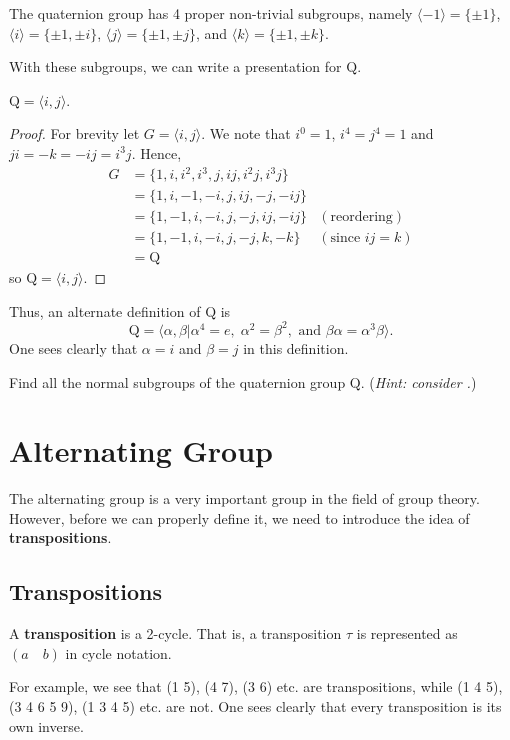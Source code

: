 The quaternion group has 4 proper non-trivial subgroups, namely $\langle -1 \rangle = \{\pm1\}$, $\langle i \rangle = \{\pm1, \pm i\}$, $\langle j \rangle = \{\pm1, \pm j\}$, and $\langle k \rangle = \{\pm1, \pm k\}$.

With these subgroups, we can write a presentation for $\mathrm{Q}$.
\begin{proposition}
    $\mathrm{Q} = \langle i, j \rangle$.
\end{proposition}
\begin{proof}
    For brevity let $G = \langle i, j \rangle$. We note that $i^0 = 1$, $i^4 = j^4 = 1$ and $ji = -k = -ij = i^3j$. Hence,
    \begin{align*}
        G &= \{1, i, i^2, i^3, j, ij, i^2j, i^3j\}\\
        &= \{1, i, -1, -i, j, ij, -j, -ij\}\\
        &= \{1, -1, i, -i, j, -j, ij, -ij\} & (\text{reordering})\\
        &= \{1, -1, i, -i, j, -j, k, -k\} & (\text{since } ij = k)\\
        &= \mathrm{Q}
    \end{align*}
    so $\mathrm{Q} = \langle i, j \rangle$.
\end{proof}

Thus, an alternate definition of $\mathrm{Q}$ is
\[
    \mathrm{Q} = \langle \alpha, \beta \vert \alpha^4 = e,\; \alpha^2 = \beta^2, \text{ and } \beta\alpha = \alpha^3\beta \rangle.
\]
One sees clearly that $\alpha = i$ and $\beta = j$ in this definition.

\begin{exercise}\label{exercise-normal-subgroups-of-quarternion-group}
    Find all the normal subgroups of the quaternion group $\mathrm{Q}$.\newline
    (\textit{Hint: consider .})
\end{exercise}

\section{Alternating Group}
The alternating group is a very important group in the field of group theory. However, before we can properly define it, we need to introduce the idea of \textbf{transpositions}.

\subsection{Transpositions}
\begin{definition}
    A \textbf{transposition} is a 2-cycle. That is, a transposition $\tau$ is represented as $(a\quad b)$ in cycle notation.
\end{definition}
For example, we see that (1 5), (4 7), (3 6) etc. are transpositions, while (1 4 5), (3 4 6 5 9), (1 3 4 5) etc. are not. One sees clearly that every transposition is its own inverse.

